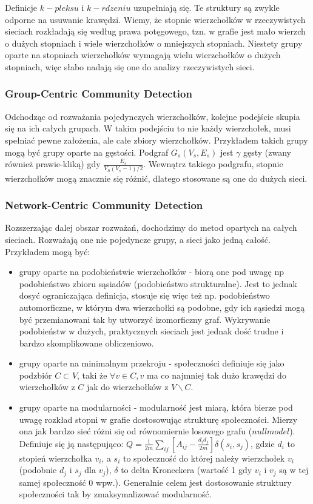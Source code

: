 \documentclass{article}
\begin{document}
Definicje $k-pleksu$ i $k - rdzeniu$ uzupełniają się. Te struktury są zwykle odporne na usuwanie krawędzi. Wiemy, że stopnie wierzchołków w rzeczywistych sieciach rozkładają się według prawa potęgowego, tzn. w grafie jest mało wierzch o dużych stopniach i wiele wierzchołków o mniejszych stopniach. Niestety grupy oparte na stopniach wierzchołków wymagają wielu wierzchołków o dużych stopniach, więc słabo nadają się one do analizy rzeczywistych sieci.
\subsubsection{Group-Centric Community Detection}
Odchodząc od rozważania pojedynczych wierzchołków, kolejne podejście skupia się na ich całych grupach. W takim podejściu to nie każdy wierzchołek, musi spełniać pewne założenia, ale całe zbiory wierzchołków. Przykładem takich grupy mogą być grupy oparte na gęstości. Podgraf $G_s(V_s,E_s)$ jest $\gamma$ gęsty (zwany również prawie-kliką) gdy $\frac{E_s}{V_S(V_s-1)/2}$. Wewnątrz takiego podgrafu, stopnie wierzchołków mogą znacznie się różnić, dlatego stosowane są one do dużych sieci.
\subsubsection{Network-Centric Community Detection}
\label{subsubsection:net-cent}
Rozszerzając dalej obszar rozważań, dochodzimy do metod opartych na całych sieciach. Rozważają one nie pojedyncze grupy, a sieci jako jedną całość. Przykładem mogą być: 
\begin{itemize}
\item grupy oparte na podobieństwie wierzchołków - biorą one pod uwagę np podobieństwo zbioru sąsiadów (podobieństwo strukturalne). Jest to jednak dosyć ograniczająca definicja, stosuje się więc też np. podobieństwo automorficzne, w którym dwa wierzchołki są podobne, gdy ich sąsiedzi mogą być przemianowani tak by utworzyć izomorficzny graf. Wykrywanie podobieństw w dużych, praktycznych sieciach jest jednak dość trudne i bardzo skomplikowane obliczeniowo.
\item grupy oparte na minimalnym przekroju - społeczności definiuje się jako podzbiór $C \subset V$, taki że $\forall v \in C, v$ ma co najmniej tak dużo krawędzi do wierzchołków z $C$ jak do wierzchołków z $V \backslash C$.
\item grupy oparte na modularności - modularność jest miarą, która bierze pod uwagę rozkład stopni w grafie dostosowując strukturę społeczności. Mierzy ona jak bardzo sieć różni się od równomiernie losowego grafu ($null model$). Definiuje się ją następująco: $Q= \frac{1}{2m} \sum\limits_{ij} [A_{ij} - \frac{d_i d_j}{2m}]\delta(s_i,s_j)$, gdzie $d_i$ to stopień wierzchołka $v_i$, a $s_i$ to społeczność do której należy wierzchołek $v_i$ (podobnie $d_j$ i $s_j$ dla $v_j$), $\delta$ to delta Kroneckera (wartość 1 gdy $v_i$ i $v_j$ są w tej samej społeczność 0 wpw.). Generalnie celem jest dostosowanie struktury społeczności tak by zmaksymalizować modularność.
\end{itemize}
\end{document}
